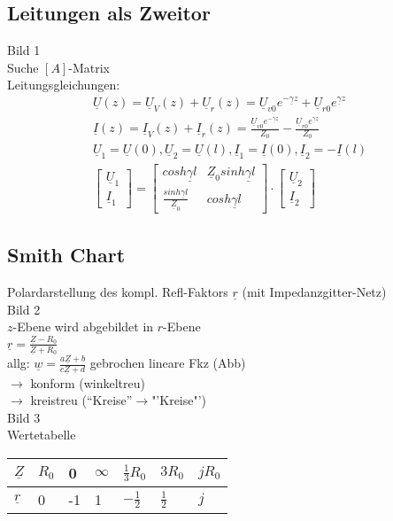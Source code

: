 \subsection{Leitungen als Zweitor}
Bild 1\\
Suche $[A]$-Matrix\\
Leitungsgleichungen:\\
\begin{align}
	\underline{U}(z)=\underline{U}_V(z)+\underline{U}_r(z)=\underline{U}_{v0}e^{-\underline{\gamma}z}+\underline{U}_{r0}e^{\underline{\gamma}z}\nonumber\\
	\underline{I}(z)=\underline{I}_V(z)+\underline{I}_r(z)=\frac{\underline{U}_{v0}e^{-\underline{\gamma}z}}{Z_0}-\frac{\underline{U}_{r0}e^{\underline{\gamma}z}}{Z_0}\nonumber\\
	\underline{U}_1=\underline{U}(0), \underline{U}_2=\underline{U}(l),
	\underline{I}_1=\underline{I}(0), \underline{I}_2=-\underline{I}(l)\nonumber\\
	\begin{bmatrix}
 		\underline{U}_1\\
 		\underline{I}_1
	\end{bmatrix}=
	\begin{bmatrix}
 		cosh\underline{\gamma}l & \underline{Z}_0sinh\underline{\gamma}l\\
 		\frac{sinh\underline{\gamma}l}{\underline{Z}_0} & cosh\underline{\gamma}l
	\end{bmatrix}\cdot
	\begin{bmatrix}
		\underline{U}_2\\
		\underline{I}_2
	\end{bmatrix}\nonumber
\end{align}

\subsection{Smith Chart}
Polardarstellung des kompl. Refl-Faktors $\underline{r}$ (mit
Impedanzgitter-Netz)\\
Bild 2\\
$z$-Ebene wird abgebildet in $r$-Ebene\\
$\underline{r}=\frac{\underline{Z}-R_0}{\underline{Z}+R_0}$\\
allg: $\underline{w}=\frac{a\underline{Z}+b}{c\underline{Z}+d}$ gebrochen
lineare Fkz (Abb)\\
$\rightarrow$ konform (winkeltreu)\\
$\rightarrow$ kreistreu ("`Kreise"'$\rightarrow$"'Kreise"')\\
Bild 3\\
Wertetabelle\\
\begin{tabular}{|l|l|l|l|l|l|l|}
	\hline
	$\underline{Z}$ & $R_0$ & 0 & $\infty$ & $\frac{1}{3}R_0$ & $3R_0$ & $jR_0$\\
	\hline
	$\underline{r}$ & 0 & -1 & 1 & $-\frac{1}{2}$ & $\frac{1}{2}$ & $j$\\
	\hline
\end{tabular}
